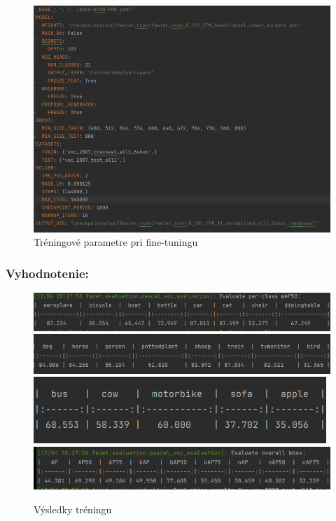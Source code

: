 \begin{figure}[H]
\includegraphics[width=\textwidth]{images/Training_parameters.png}
\caption{Tréningové parametre pri fine-tuningu}
\label{fig:image}
\end{figure}

\subsubsection{Vyhodnotenie:}

\begin{figure}[H]
\includegraphics[width=\textwidth]{images/eval1.png}
\includegraphics[width=\textwidth]{images/eval2.png}
\includegraphics[width=\textwidth]{images/eval3.png}
\includegraphics[width=\textwidth]{images/eval4.png}
\caption{Výsledky tréningu}
\label{fig:image}
\end{figure}



